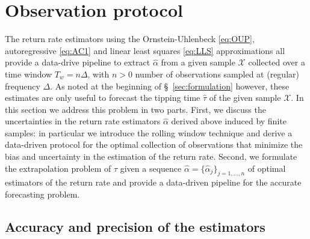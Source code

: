 \documentclass[11pt,a4paper]{article}
\theoremstyle{plain}
\theoremstyle{definition}
\theoremstyle{remark}
\begin{document}
\section{Observation protocol}\label{sec:observation}
The return rate estimators using the Ornstein-Uhlenbeck \eqref{eq:OUP}, autoregressive \eqref{eq:AC1} and linear least squares \eqref{eq:LLS} approximations all provide a data-drive pipeline to extract $\hat\alpha$ from a given sample $\mathcal{X}$ collected over a time window $T_w=n\Delta$, with $n>0$ number of observations sampled at (regular) frequency $\Delta$.
As noted at the beginning of \S~\ref{sec:formulation} however, these estimates are only useful to forecast the tipping time $\hat\tau$ of the given sample $\mathcal{X}$.
In this section we address this problem in two parts. 
First, we discuss the uncertainties in the return rate estimators $\hat\alpha$ derived above induced by finite samples: in particular we introduce the rolling window technique and derive a data-driven protocol for the optimal collection of observations that minimize the bias and uncertainty in the estimation of the return rate.
Second, we formulate the extrapolation problem of $\hat\tau$ given a sequence $\hat\alpha=\{\hat\alpha_j\}_{j=1,\dots,n}$ of optimal estimators of the return rate and provide a data-driven pipeline for the accurate forecasting problem.

\subsection{Accuracy and precision of the estimators}\label{subsec:estimators}
\end{document}
